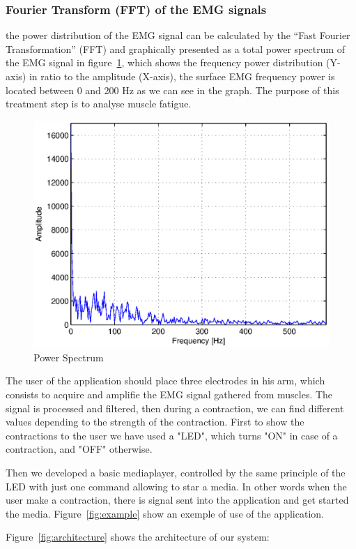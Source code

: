 \documentclass[conference]{IEEEtran}
\begin{document}
\subsubsection{Fourier Transform (FFT) of the EMG signals} \label{sub:FourierTransform(FFT)oftheEMGsignals}\par 
the power distribution of the EMG signal can be calculated by the “Fast Fourier Transformation” (FFT) and graphically presented as a total power
spectrum of the EMG signal in figure~\ref{fig:spectre}, which shows the frequency power distribution (Y-axis) in ratio to the amplitude (X-axis), the surface EMG frequency power is located between 0 and 200 Hz as we can see in the graph. The purpose of this treatment step is to analyse muscle fatigue.\par

\begin{figure}
    \hspace*{1.2 cm}
    \includegraphics[scale=0.40]{Figures/fft1.eps}
    \caption{Power Spectrum}
    \label{fig:spectre}
\end{figure}


The user of the application should place three electrodes in his arm, which consists to acquire and amplifie the EMG signal gathered from muscles. 
The signal is processed and filtered, then during a contraction, we can find different values depending to the strength of the contraction. 
First to show the contractions to the user we have used a "LED", which turns "ON" in case of a contraction, and "OFF" otherwise.\par
Then we developed a basic mediaplayer, controlled by the same principle of the LED with just one command allowing to star a media. In other words
when the user make a contraction, there is signal sent into the application and get started the media.
Figure~\ref{fig:example} show an exemple of use of the application. \par
\par
Figure~\ref{fig:architecture} shows the architecture of our system:
\end{document}
